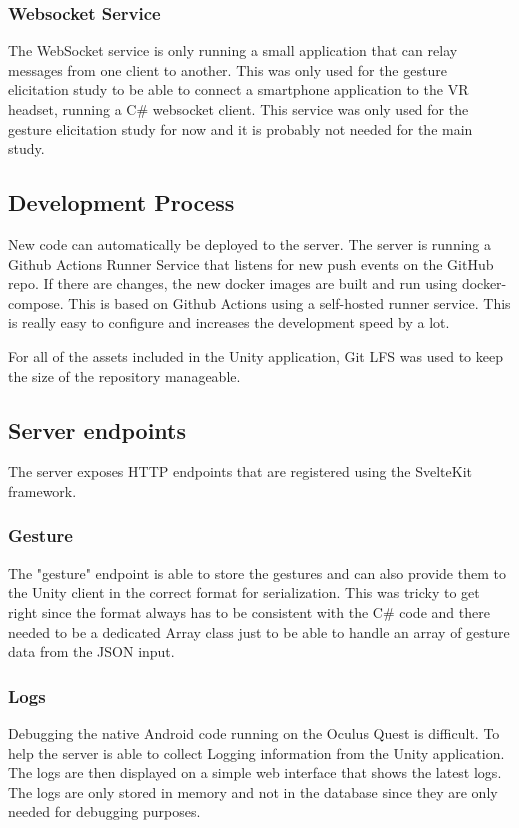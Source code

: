 \subsubsection{Websocket Service}
The WebSocket service is only running a small application that can relay messages from one client to another. This was only used for the gesture elicitation study to be able to connect a smartphone application to the VR headset, running a C\# websocket client. This service was only used for the gesture elicitation study for now and it is probably not needed for the main study.


\subsection{Development Process}
New code can automatically be deployed to the server. The server is running a Github Actions Runner Service that listens for new push events on the GitHub repo. If there are changes, the new docker images are built and run using docker-compose. This is based on Github Actions using a self-hosted runner service. This is really easy to configure and increases the development speed by a lot. 

For all of the assets included in the Unity application, Git LFS was used to keep the size of the repository manageable.


\subsection{Server endpoints}
The server exposes HTTP endpoints that are registered using the SvelteKit framework.

\subsubsection{Gesture}
The "gesture" endpoint is able to store the gestures and can also provide them to the Unity client in the correct format for serialization. This was tricky to get right since the format always has to be consistent with the C\# code and there needed to be a dedicated Array class just to be able to handle an array of gesture data from the JSON input.

\subsubsection{Logs}
Debugging the native Android code running on the Oculus Quest is difficult. To help the server is able to collect Logging information from the Unity application. The logs are then displayed on a simple web interface that shows the latest logs. The logs are only stored in memory and not in the database since they are only needed for debugging purposes. 


